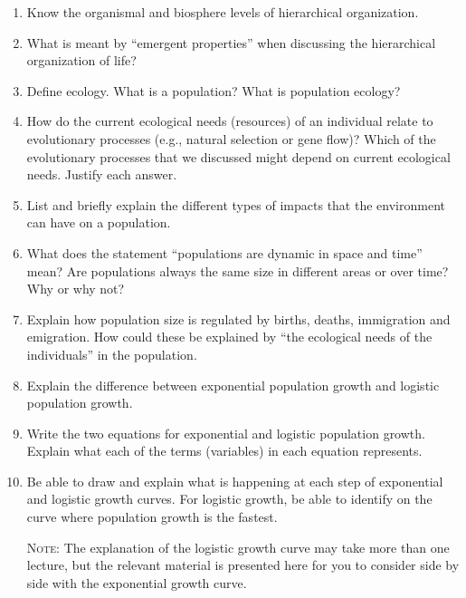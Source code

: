\documentclass[letterpaper]{tufte-handout}
\begin{document}
\begin{enumerate}

	
	\item Know the organismal and biosphere levels of hierarchical organization.
	
	\item What is meant by ``emergent properties'' when discussing the hierarchical organization of life?
	
	\item Define ecology. What is a population? What is population ecology?
	

	\item How do the current ecological needs (resources) of an individual relate to evolutionary processes (e.g., natural selection or gene flow)?   Which of the evolutionary processes that we discussed might depend on current ecological needs.  Justify each answer.

\item List and briefly explain the different types of impacts that the environment can have on a population.

\item What does the statement ``populations are dynamic in space and time'' mean?  Are populations always the same size in different areas or over time?  Why or why not?

\item Explain how population size is regulated by births, deaths, immigration and emigration.  How could these be explained by ``the ecological needs of the individuals'' in the population.

\item Explain the difference between exponential population growth and logistic population growth. 

\item	Write the two equations for exponential and logistic population growth. Explain what each of the terms (variables) in each equation represents.

\item Be able to draw and explain what is happening at each step of exponential and logistic growth curves. For logistic growth, be able to identify on the curve where population growth is the fastest.

\textsc{Note:}  The explanation of the logistic growth curve may take more than one lecture, but the relevant material is presented here for you to consider side by side with the exponential growth curve. 

\end{enumerate}
\end{document}
